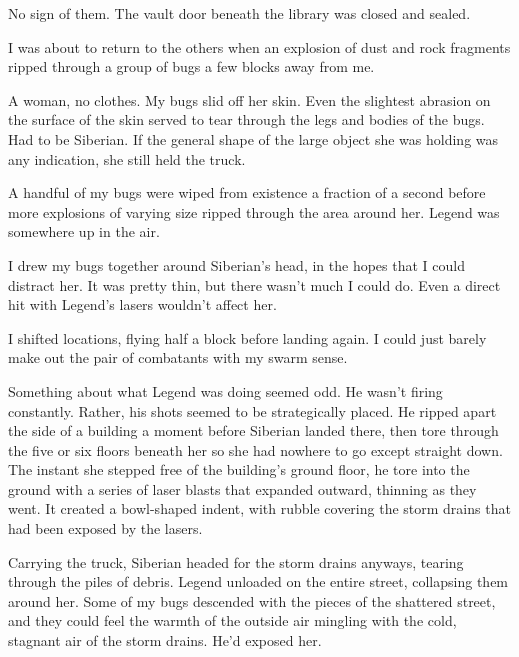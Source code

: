 No sign of them.  The vault door beneath the library was closed and sealed.



I was about to return to the others when an explosion of dust and rock fragments ripped through a group of bugs a few blocks away from me.



A woman, no clothes.  My bugs slid off her skin.  Even the slightest abrasion on the surface of the skin served to tear through the legs and bodies of the bugs.  Had to be Siberian.  If the general shape of the large object she was holding was any indication, she still held the truck.



A handful of my bugs were wiped from existence a fraction of a second before more explosions of varying size ripped through the area around her.  Legend was somewhere up in the air.



I drew my bugs together around Siberian's head, in the hopes that I could distract her.  It was pretty thin, but there wasn't much I could do.  Even a direct hit with Legend's lasers wouldn't affect her.



I shifted locations, flying half a block before landing again.  I could just barely make out the pair of combatants with my swarm sense.



Something about what Legend was doing seemed odd.  He wasn't firing constantly.  Rather, his shots seemed to be strategically placed.  He ripped apart the side of a building a moment before Siberian landed there, then tore through the five or six floors beneath her so she had nowhere to go except straight down.  The instant she stepped free of the building's ground floor, he tore into the ground with a series of laser blasts that expanded outward, thinning as they went.  It created a bowl-shaped indent, with rubble covering the storm drains that had been exposed by the lasers.



Carrying the truck, Siberian headed for the storm drains anyways, tearing through the piles of debris.  Legend unloaded on the entire street, collapsing them around her.  Some of my bugs descended with the pieces of the shattered street, and they could feel the warmth of the outside air mingling with the cold, stagnant air of the storm drains.  He'd exposed her.



